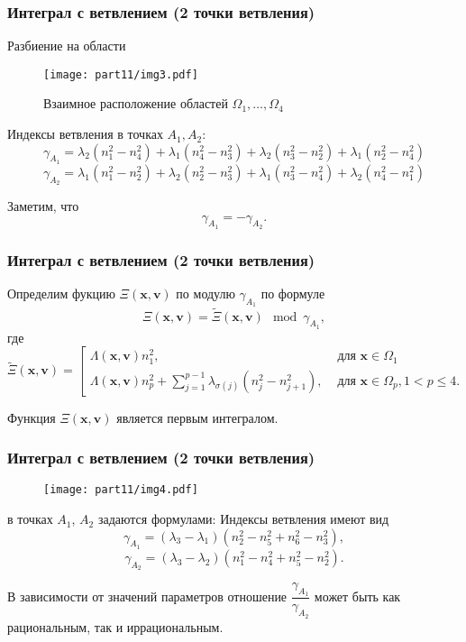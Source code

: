 \begin{frame}
\frametitle{Интеграл с ветвлением (2 точки ветвления)}

\qq Разбиение на области
\begin{figure}[!htb]
    \centering
     \texttt{[image: part11/img3.pdf]}
\caption{Взаимное расположение областей $\Omega_1,\ldots,\Omega_4$}
\end{figure} 

\qq Индексы  ветвления в точках $A_1, A_2$:
$$\gamma_{A_1} = \lambda_2(n_1^2 - n_4^2) + \lambda_1(n_4^2-n_3^2) + \lambda_2(n_3^2-n_2^2) + \lambda_1(n_2^2-n_4^2)%
$$
$$\gamma_{A_2} = \lambda_1(n_1^2 - n_2^2) + \lambda_2(n_2^2-n_3^2) + \lambda_1(n_3^2-n_4^2) + \lambda_2(n_4^2-n_1^2) %
$$

\qq Заметим, что $$\gamma_{A_1} = -\gamma_{A_2}.$$
\end{frame}

\begin{frame}
\frametitle{Интеграл с ветвлением (2 точки ветвления)}
\qq
Определим  фукцию 
$\Xi(\mathbf{x}, \mathbf{v})$ по модулю $\gamma_{A_1}$  по формуле $$\Xi(\mathbf{x}, \mathbf{v}) = \widetilde{\Xi}(\mathbf{x}, \mathbf{v}) \mod \gamma_{A_1},$$
где 
\begin{equation*}
\widetilde{\Xi}(\mathbf{x}, \mathbf{v}) = \left[
\begin{array}{ll}
    \Lambda(\mathbf{x}, \mathbf{v}) n_1^2, &  \text{ для } \mathbf{x} \in \Omega_1 
    \\
    \Lambda(\mathbf{x}, \mathbf{v}) n_p^2 + 
    \sum_{j=1}^{p-1} \lambda_{\sigma(j)}(n_j^2-n_{j+1}^2), & \text{ для } \mathbf{x} \in \Omega_p, 1 < p \leq 4. 
\end{array}
\right.
\end{equation*}

\begin{mytheorem}
Функция $\Xi(\mathbf{x}, \mathbf{v})$ является первым интегралом.
\end{mytheorem}
\end{frame}

\begin{frame}\frametitle{Интеграл с ветвлением  (2 точки ветвления)}


\begin{figure}[!h]
    \centering
     \texttt{[image: part11/img4.pdf]}
\end{figure}

в точках $A_1$, $A_2$ задаются формулами:
\qq Индексы ветвления  имеют вид
$$\gamma_{A_1} = (\lambda_3 - \lambda_1)(n_2^2 - n_5^2 + n_6^2 - n_3^2),$$
$$\gamma_{A_2} = (\lambda_3 - \lambda_2)(n_1^2 - n_4^2 + n_5^2 - n_2^2).$$

\qq В зависимости от значений параметров отношение $\dfrac{\gamma_{A_1}}{\gamma_{A_2}}$ может быть как рациональным, так и иррациональным.
\end{frame}


